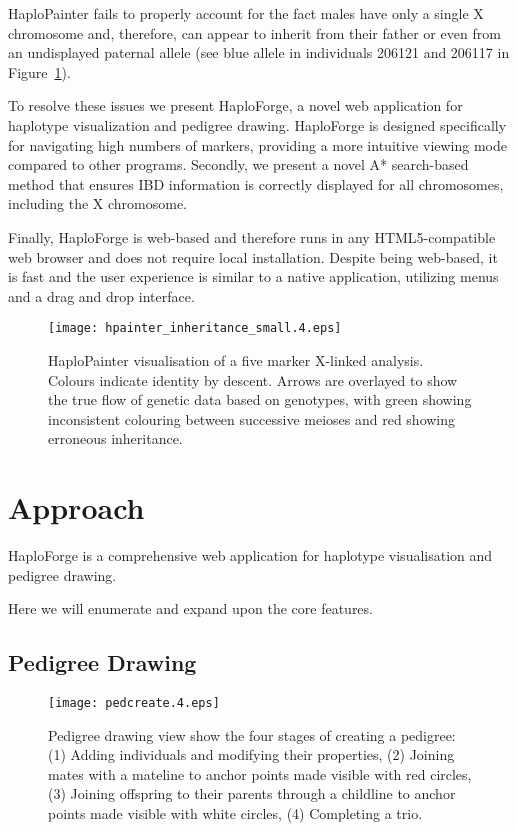 \documentclass{bioinfo}
\numberwithin{equation}{section}
\def\haplo{{HaploForge}}
\def\hpainter{{HaploPainter}}
\begin{document}
\hpainter{} fails to properly account for the fact males have only a single X chromosome and, therefore, can appear to inherit from their father or even from an undisplayed paternal allele (see blue allele in individuals 206121 and 206117 in Figure~\ref{fig:hpainterx}).

To resolve these issues we present \haplo{}, a novel web application for haplotype visualization and pedigree drawing. \haplo{} is designed specifically for navigating high numbers of markers, providing a more intuitive viewing mode compared to other programs. 
Secondly, we present a novel A* search-based method that ensures IBD information is correctly displayed for all chromosomes, including the X chromosome.

Finally, \haplo{} is web-based and therefore runs in any HTML5-compatible web browser and does not require local installation. Despite being web-based, it is fast and the user experience is similar to a native application, utilizing menus and a drag and drop interface.

\begin{figure}[!tpb]
	\centerline{\texttt{[image: hpainter\_inheritance\_small.4.eps]}}\caption{\hpainter{} visualisation of a five marker X-linked analysis. Colours indicate identity by descent. Arrows are overlayed to show the true flow of genetic data based on genotypes, with green showing inconsistent colouring between successive meioses and red showing erroneous inheritance.}\label{fig:hpainterx}
\end{figure}



\section{Approach}

\haplo{} is a comprehensive web application for haplotype visualisation and pedigree drawing.\

Here we will enumerate and expand upon the core features.

\subsection{Pedigree Drawing}

\begin{figure}[!tpb]
	\centerline{\texttt{[image: pedcreate.4.eps]}}\caption{Pedigree drawing view show the four stages of creating a pedigree: (1) Adding individuals and modifying their properties, (2) Joining mates with a mateline to anchor points made visible with red circles, (3) Joining offspring to their parents through a childline to anchor points made visible with white circles, (4) Completing a trio.}\label{fig:pedcreate}
\end{figure}
	
\end{document}

